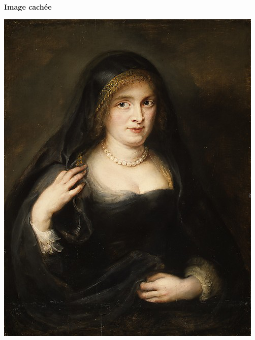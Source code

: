 \documentclass[a4paper, french, 12pt]{article}  %
\begin{document}
\begin{minipage}{0.3\linewidth}
\begin{center}
\textbf{Image cachée}

\includegraphics[scale=0.4]{images/femme.png}
\end{center}
\end{minipage}\hfill
\hfill
\end{document}

